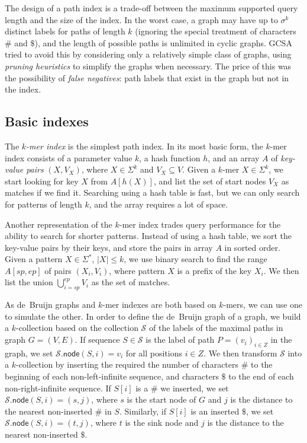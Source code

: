 \documentclass[a4paper,UKenglish]{lipics-v2016}
\newcommand{\abs}[1]{\ensuremath{\lvert #1 \rvert}}
\newcommand{\gnode}{\ensuremath{\mathsf{node}}}
\newcommand{\kmer}[1]{$#1$\nobreakdash-mer}
\newcommand{\kcollection}[1]{$#1$\nobreakdash-collection}
\begin{document}
The design of a path index is a trade-off between the maximum supported query length and the size of the index. In the worst case, a graph may have up to $\sigma^{k}$ distinct labels for paths of length $k$ (ignoring the special treatment of characters $\#$ and $\$$), and the length of possible paths is unlimited in cyclic graphs. GCSA \cite{Siren2014} tried to avoid this by considering only a relatively simple class of graphs, using \emph{pruning heuristics} to simplify the graphs when necessary. The price of this was the possibility of \emph{false negatives}: path labels that exist in the graph but not in the index.

\subsection{Basic indexes}

The \emph{\kmer{k} index} is the simplest path index. In its most basic form, the \kmer{k} index consists of a parameter value $k$, a hash function $h$, and an array $A$ of \emph{key-value pairs} $(X, V_{X})$, where $X \in \Sigma^{k}$ and $V_{X} \subseteq V$. Given a \kmer{k} $X \in \Sigma^{k}$, we start looking for key $X$ from $A[h(X)]$, and list the set of start nodes $V_{X}$ as matches if we find it. Searching using a hash table is fast, but we can only search for patterns of length $k$, and the array requires a lot of space.

Another representation of the \kmer{k} index trades query performance for the ability to search for shorter patterns. Instead of using a hash table, we sort the key-value pairs by their keys, and store the pairs in array $A$ in sorted order. Given a pattern $X \in \Sigma^{\ast}$, $\abs{X} \le k$, we use binary search to find the range $A[sp, ep]$ of pairs $(X_{i}, V_{i})$, where pattern $X$ is a prefix of the key $X_{i}$. We then list the union $\bigcup_{i=sp}^{ep} V_{i}$ as the set of matches.

As de~Bruijn graphs and \kmer{k} indexes are both based on \kmer{k}s, we can use one to simulate the other. In order to define the de~Bruijn graph of a graph, we build a \kcollection{k} based on the collection $\mathcal{S}$ of the labels of the maximal paths in graph $G = (V, E)$. If sequence $S \in \mathcal{S}$ is the label of path $P = (v_{i})_{i \in Z}$ in the graph, we set $\mathcal{S}.\gnode(S, i) = v_{i}$ for all positions $i \in Z$. We then transform $\mathcal{S}$ into a \kcollection{k} by inserting the required the number of characters $\#$ to the beginning of each non-left-infinite sequence, and characters $\$$ to the end of each non-right-infinite sequence. If $S[i]$ is a $\#$ we inserted, we set $\mathcal{S}.\gnode(S, i) = (s, j)$, where $s$ is the start node of $G$ and $j$ is the distance to the nearest non-inserted $\#$ in $S$. Similarly, if $S[i]$ is an inserted $\$$, we set $\mathcal{S}.\gnode(S, i) = (t, j)$, where $t$ is the sink node and $j$ is the distance to the nearest non-inserted $\$$.
\end{document}
